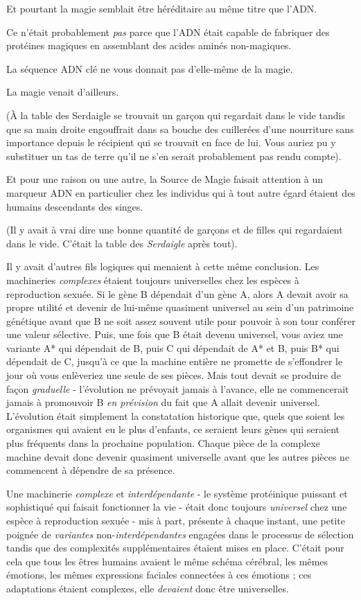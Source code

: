 Et pourtant la magie semblait être héréditaire au même titre que l'ADN.

Ce n'était probablement \emph{pas} parce que l'ADN était capable de fabriquer des protéines magiques en assemblant des acides aminés non-magiques.

La séquence ADN clé ne vous donnait pas d'elle-même de la magie.

La magie venait d'ailleurs.

(À la table des Serdaigle se trouvait un garçon qui regardait dans le vide tandis que sa main droite engouffrait dans sa bouche des cuillerées d'une nourriture sans importance depuis le récipient qui se trouvait en face de lui. Vous auriez pu y substituer un tas de terre qu'il ne s'en serait probablement pas rendu compte).

Et pour une raison ou une autre, la Source de Magie faisait attention à un marqueur ADN en particulier chez les individus qui à tout autre égard étaient des humains descendants des singes.

(Il y avait à vrai dire une bonne quantité de garçons et de filles qui regardaient dans le vide. C'était la table des \emph{Serdaigle } après tout).

Il y avait d'autres fils logiques qui menaient à cette même conclusion. Les machineries \emph{complexes}  étaient toujours universelles chez les espèces à reproduction sexuée. Si le gène B dépendait d'un gène A, alors A devait avoir sa propre utilité et devenir de lui-même quasiment universel au sein d'un patrimoine génétique avant que B ne soit assez souvent utile pour pouvoir à son tour conférer une valeur sélective. Puis, une fois que B était devenu universel, vous aviez une variante A* qui dépendait de B, puis C qui dépendait de A* et B, puis B* qui dépendait de C, jusqu'à ce que la machine entière ne promette de s'effondrer le jour où vous enlèveriez une seule de ses pièces. Mais tout devait se produire de façon \emph{graduelle}  - l'évolution ne prévoyait jamais à l'avance, elle ne commencerait jamais à promouvoir B \emph{en prévision} du fait que A allait devenir universel. L'évolution était simplement la constatation historique que, quels que soient les organismes qui avaient eu le plus d'enfants, ce seraient leurs gènes qui seraient plus fréquents dans la prochaine population. Chaque pièce de la complexe machine devait donc devenir quasiment universelle avant que les autres pièces ne commencent à dépendre de sa présence.

Une machinerie \emph{complexe } et \emph{interdépendante}  - le système protéinique puissant et sophistiqué qui faisait fonctionner la vie - était donc toujours \emph{universel}  chez une espèce à reproduction sexuée - mis à part, présente à chaque instant, une petite poignée de \emph{variantes}  non-\emph{interdépendantes}  engagées dans le processus de sélection tandis que des complexités supplémentaires étaient mises en place. C'était pour cela que tous les êtres humains avaient le même schéma cérébral, les mêmes émotions, les mêmes expressions faciales connectées à ces émotions ; ces adaptations étaient complexes, elle \emph{devaient} donc être universelles.

